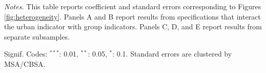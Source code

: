 \documentclass[12pt]{article}
\makeatletter
\let\@@input
\makeatother
\begin{document}
\begin{table}[ht]
{\begin{threeparttable}
    \begin{tablenotes}[flushleft]\footnotesize
        \item\textit{Notes.} This table reports coefficient and standard errors corresponding to Figures \ref{fig:heterogeneity}. Panels A and B report results from specifications that interact the urban indicator with group indicators. Panels C, D, and E report results from separate subsamples.
        
        \item Signif.
Codes: $^{***}$: 0.01, $^{**}$: 0.05, $^{*}$: 0.1.
Standard errors are clustered  by MSA/CBSA.
    \end{tablenotes}
  \end{threeparttable}
  }

\end{table}

\newpage\clearpage

\begin{table}[ht]
  \caption{Industry-Specific Urban Wage Premium Estimates, 1940-2010}
  \label{tab:industry_specific}
  \renewcommand{\arraystretch}{1.25}


\end{table}
\end{document}
